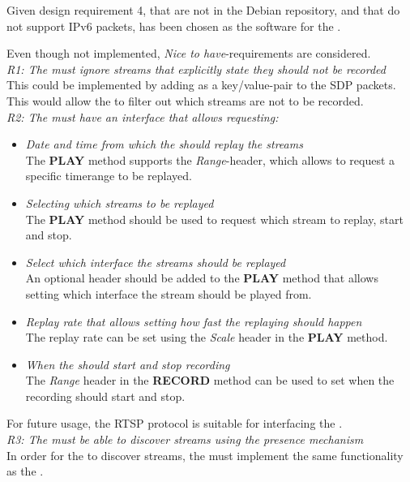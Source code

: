 \noindent{}Given design requirement 4, that  are not in the Debian repository, and that  do not support IPv6 packets,  has been chosen as the software for the .\\

Even though not implemented, \textit{Nice to have}-requirements are considered.\\
\noindent{}\textit{R1: The  must ignore streams that explicitly state they should not be recorded}\\
This could be implemented by adding as a key/value-pair to the SDP packets. This would allow the \hist{} to filter out which streams are not to be recorded.\\

\noindent\textit{R2: The  must have an interface that allows requesting:}\\
\begin{itemize}
	\item \textit{Date and time from which the  should replay the streams} \\
	The \textbf{PLAY} method supports the \textit{Range}-header, which allows to request a specific timerange to be replayed.
	\item \textit{Selecting which streams to be replayed}\\
	The \textbf{PLAY} method should be used to request which stream to replay, start and stop.
	\item \textit{Select which interface the streams should be replayed}\\
	An optional header should be added to the \textbf{PLAY} method that allows setting which interface the stream should be played from.
	\item \textit{Replay rate that allows setting how fast the replaying should happen}\\
	The replay rate can be set using the \textit{Scale} header in the \textbf{PLAY} method.
	\item \textit{When the  should start and stop recording}\\
	The \textit{Range} header in the \textbf{RECORD} method can be used to set when the recording should start and stop.
\end{itemize}
For future usage, the RTSP protocol is suitable for interfacing the \hist{}.\\

\noindent\textit{R3: The  must be able to discover streams using the presence mechanism} \\
In order for the \hist{} to discover streams, the \hist{} must implement the same functionality as the \sub{}.




